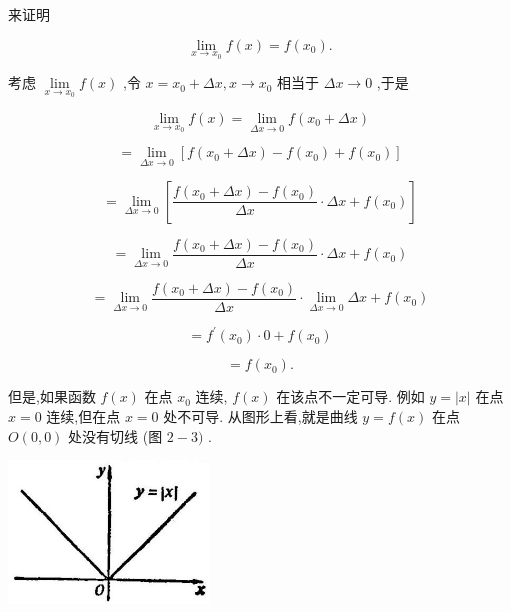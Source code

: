 \documentclass[10pt]{article}
\begin{document}
来证明

\[
\mathop{\lim }\limits_{{x \rightarrow {x}_{0}}}f\left( x\right) = f\left( {x}_{0}\right) .
\]

考虑 \(\mathop{\lim }\limits_{{x \rightarrow {x}_{0}}}f\left( x\right)\) ,令 \(x = {x}_{0} + {\Delta x},x \rightarrow {x}_{0}\) 相当于 \({\Delta x} \rightarrow 0\) ,于是

\[
\mathop{\lim }\limits_{{x \rightarrow {x}_{0}}}f\left( x\right) = \mathop{\lim }\limits_{{{\Delta x} \rightarrow 0}}f\left( {{x}_{0} + {\Delta x}}\right)
\]

\[
= \mathop{\lim }\limits_{{{\Delta x} \rightarrow 0}}\left\lbrack {f\left( {{x}_{0} + {\Delta x}}\right) - f\left( {x}_{0}\right) + f\left( {x}_{0}\right) }\right\rbrack
\]

\[
= \mathop{\lim }\limits_{{{\Delta x} \rightarrow 0}}\left\lbrack {\frac{f\left( {{x}_{0} + {\Delta x}}\right) - f\left( {x}_{0}\right) }{\Delta x} \cdot {\Delta x} + f\left( {x}_{0}\right) }\right\rbrack
\]

\[
= \mathop{\lim }\limits_{{{\Delta x} \rightarrow 0}}\frac{f\left( {{x}_{0} + {\Delta x}}\right) - f\left( {x}_{0}\right) }{\Delta x} \cdot {\Delta x} + f\left( {x}_{0}\right)
\]

\[
= \mathop{\lim }\limits_{{{\Delta x} \rightarrow 0}}\frac{f\left( {{x}_{0} + {\Delta x}}\right) - f\left( {x}_{0}\right) }{\Delta x} \cdot \mathop{\lim }\limits_{{{\Delta x} \rightarrow 0}}{\Delta x} + f\left( {x}_{0}\right)
\]

\[
= {f}^{\prime }\left( {x}_{0}\right) \cdot 0 + f\left( {x}_{0}\right)
\]

\[
= f\left( {x}_{0}\right) \text{.}
\]

但是,如果函数 \(f\left( x\right)\) 在点 \({x}_{0}\) 连续, \(f\left( x\right)\) 在该点不一定可导. 例如 \(y = \left| x\right|\) 在点 \(x = 0\) 连续,但在点 \(x = 0\) 处不可导. 从图形上看,就是曲线 \(y = f\left( x\right)\) 在点 \(O\left( {0,0}\right)\) 处没有切线 (图 \(2 - 3)\) .

\begin{center}
\includegraphics[max width=0.4\textwidth]{images/01912c18-5c3f-733d-b775-749ba9897a9d_69_933568.jpg}
\end{center}
\end{document}
